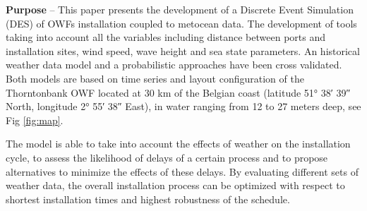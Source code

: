 \textbf{Purpose} --
This paper presents the development of a Discrete Event Simulation (DES) of OWFs installation coupled to metocean data. The development of tools taking into account all the variables including distance between ports and installation sites, wind speed, wave height and sea state parameters. An historical weather data model and a probabilistic approaches have been cross validated. Both models are based on time series and layout configuration of the Thorntonbank OWF located at 30 km of the Belgian coast (latitude 51° 38′ 39″ North, longitude 2° 55′ 38″ East), in water ranging from 12 to 27 meters deep, see Fig \ref{fig:map}.

The model is able to take into account the effects of weather on the installation cycle, to assess the likelihood of delays of a certain process and to propose alternatives to minimize the effects of these delays. By evaluating different sets of weather data, the overall installation process can be optimized with respect to shortest installation times and highest robustness of the schedule.

